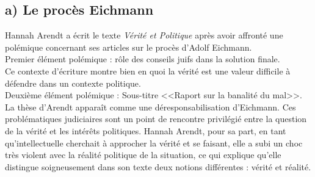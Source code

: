 \documentclass[12pt]{article}
\begin{document}
\subsection*{a) Le procès Eichmann}
Hannah Arendt a écrit le texte \emph{Vérité et Politique} après avoir affronté une polémique concernant ses articles sur le procès d'Adolf Eichmann.\\
Premier élément polémique : rôle des conseils juifs dans la solution finale.\\
Ce contexte d'écriture montre bien en quoi la vérité est une valeur difficile à défendre dans un contexte politique.\\
Deuxième élément polémique : Sous-titre <<Raport sur la banalité du mal>>.\\
La thèse d'Arendt apparaît comme une déresponsabilisation d'Eichmann.
Ces problématiques judiciaires sont un point de rencontre privilégié entre la question de la vérité et les intérêts politiques.
Hannah Arendt, pour sa part, en tant qu'intellectuelle cherchait à approcher la vérité et se faisant, elle a subi un choc très violent avec la réalité politique de la situation, ce qui explique qu'elle distingue soigneusement dans son texte deux notions différentes : vérité et réalité.
 
\end{document}
